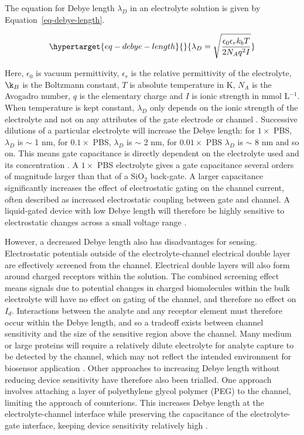 \documentclass[
  a4paper,
]{scrbook}
\begin{document}
The equation for Debye length \(\lambda_D\) in an electrolyte solution
is given by Equation~\ref{eq-debye-length}.

\begin{equation}\protect\hypertarget{eq-debye-length}{}{
\lambda_D = \sqrt{\frac{\epsilon_0\epsilon_rk_bT}{2N_Aq^2I}}
}\label{eq-debye-length}\end{equation}

Here, \(\epsilon_0\) is vacuum permittivity, \(\epsilon_r\) is the
relative permittivity of the electrolyte, \(\k_B\) is the Boltzmann
constant, \(T\) is absolute temperature in K, \(N_A\) is the Avogadro
number, \(q\) is the elementary charge and \(I\) is ionic strength in
mmol L\(^{-1}\). When temperature is kept constant, \(\lambda_D\) only
depends on the ionic strength of the electrolyte and not on any
attributes of the gate electrode or channel
\autocite{Stern2007,Shkodra2021}. Successive dilutions of a particular
electrolyte will increase the Debye length: for \(1 \times\) PBS,
\(\lambda_D\) is \(\sim\) 1 nm, for \(0.1 \times\) PBS, \(\lambda_D\) is
\(\sim\) 2 nm, for \(0.01 \times\) PBS \(\lambda_D\) is \(\sim\) 8 nm
and so on. This means gate capacitance is directly dependent on the
electrolyte used and its concentration
\autocite{Kireev2017,Shkodra2021}. A \(1 \times\) PBS electrolyte gives
a gate capacitance several orders of magnitude larger than that of a
SiO\(_2\) back-gate. A larger capacitance significantly increases the
effect of electrostatic gating on the channel current, often described
as increased electrostatic coupling between gate and channel. A
liquid-gated device with low Debye length will therefore be highly
sensitive to electrostatic changes across a small voltage range
\autocite{Heller2010,Ohno2015,Kireev2017,Yao2021}.

However, a decreased Debye length also has disadvantages for sensing.
Electrostatic potentials outside of the electrolyte-channel electrical
double layer are effectively screened from the channel. Electrical
double layers will also form around charged receptors within the
solution. The combined screening effect means signals due to potential
changes in charged biomolecules within the bulk electrolyte will have no
effect on gating of the channel, and therefore no effect on \(I_d\).
Interactions between the analyte and any receptor element must therefore
occur within the Debye length, and so a tradeoff exists between channel
sensitivity and the size of the sensitive region above the channel. Many
medium or large proteins will require a relatively dilute electrolyte
for analyte capture to be detected by the channel, which may not reflect
the intended environment for biosensor application
\autocite{Stern2007,Piccinini2018,Shkodra2021}. Other approaches to
increasing Debye length without reducing device sensitivity have
therefore also been trialled. One approach involves attaching a layer of
polyethylene glycol polymer (PEG) to the channel, limiting the approach
of counterions. This increases Debye length at the electrolyte-channel
interface while preserving the capacitance of the electrolyte-gate
interface, keeping device sensitivity relatively high
\autocite{Gao2016,Filipiak2018,Kesler2020,Albarghouthi2022}.
\end{document}

